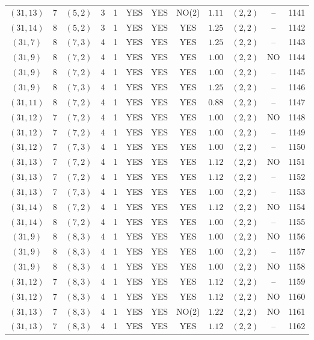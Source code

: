 \begin{longtable}{|c|c|c|c|c|c|c|c|c|c|c|c|}
$(31,13)$ & 7 & $(5,2)$ & 3 & 1 & YES & YES & NO(2) & $1.11$ & $(2,2)$ & -- & 1141\\
$(31,14)$ & 8 & $(5,2)$ & 3 & 1 & YES & YES & YES & $1.25$ & $(2,2)$ & -- & 1142\\
$(31,7)$ & 8 & $(7,3)$ & 4 & 1 & YES & YES & YES & $1.25$ & $(2,2)$ & -- & 1143\\
$(31,9)$ & 8 & $(7,2)$ & 4 & 1 & YES & YES & YES & $1.00$ & $(2,2)$ & NO & 1144\\
$(31,9)$ & 8 & $(7,2)$ & 4 & 1 & YES & YES & YES & $1.00$ & $(2,2)$ & -- & 1145\\
$(31,9)$ & 8 & $(7,3)$ & 4 & 1 & YES & YES & YES & $1.25$ & $(2,2)$ & -- & 1146\\
$(31,11)$ & 8 & $(7,2)$ & 4 & 1 & YES & YES & YES & $0.88$ & $(2,2)$ & -- & 1147\\
$(31,12)$ & 7 & $(7,2)$ & 4 & 1 & YES & YES & YES & $1.00$ & $(2,2)$ & NO & 1148\\
$(31,12)$ & 7 & $(7,2)$ & 4 & 1 & YES & YES & YES & $1.00$ & $(2,2)$ & -- & 1149\\
$(31,12)$ & 7 & $(7,3)$ & 4 & 1 & YES & YES & YES & $1.00$ & $(2,2)$ & -- & 1150\\
$(31,13)$ & 7 & $(7,2)$ & 4 & 1 & YES & YES & YES & $1.12$ & $(2,2)$ & NO & 1151\\
$(31,13)$ & 7 & $(7,2)$ & 4 & 1 & YES & YES & YES & $1.12$ & $(2,2)$ & -- & 1152\\
$(31,13)$ & 7 & $(7,3)$ & 4 & 1 & YES & YES & YES & $1.00$ & $(2,2)$ & -- & 1153\\
$(31,14)$ & 8 & $(7,2)$ & 4 & 1 & YES & YES & YES & $1.12$ & $(2,2)$ & NO & 1154\\
$(31,14)$ & 8 & $(7,2)$ & 4 & 1 & YES & YES & YES & $1.00$ & $(2,2)$ & -- & 1155\\
$(31,9)$ & 8 & $(8,3)$ & 4 & 1 & YES & YES & YES & $1.00$ & $(2,2)$ & NO & 1156\\
$(31,9)$ & 8 & $(8,3)$ & 4 & 1 & YES & YES & YES & $1.00$ & $(2,2)$ & -- & 1157\\
$(31,9)$ & 8 & $(8,3)$ & 4 & 1 & YES & YES & YES & $1.00$ & $(2,2)$ & NO & 1158\\
$(31,12)$ & 7 & $(8,3)$ & 4 & 1 & YES & YES & YES & $1.12$ & $(2,2)$ & -- & 1159\\
$(31,12)$ & 7 & $(8,3)$ & 4 & 1 & YES & YES & YES & $1.12$ & $(2,2)$ & NO & 1160\\
$(31,13)$ & 7 & $(8,3)$ & 4 & 1 & YES & YES & NO(2) & $1.22$ & $(2,2)$ & NO & 1161\\
$(31,13)$ & 7 & $(8,3)$ & 4 & 1 & YES & YES & YES & $1.12$ & $(2,2)$ & -- & 1162\\

\end{longtable}
